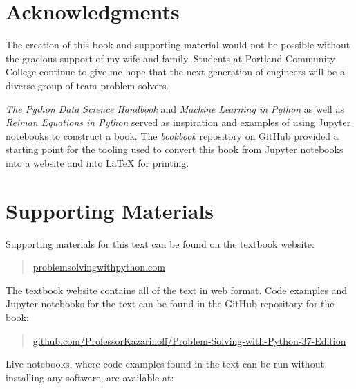\documentclass{book}
\begin{document}
    
        \hypertarget{acknowledgments}{%
\section*{Acknowledgments}\label{acknowledgments} 
 }    




    
        The creation of this book and supporting material would not be possible
without the gracious support of my wife and family. Students at Portland
Community College continue to give me hope that the next generation of
engineers will be a diverse group of team problem solvers.

\emph{The Python Data Science Handbook} and \emph{Machine Learning in
Python} as well as \emph{Reiman Equations in Python} served as
inspiration and examples of using Jupyter notebooks to construct a book.
The \emph{bookbook} repository on GitHub provided a starting point for
the tooling used to convert this book from Jupyter notebooks into a
website and into LaTeX for printing.
    




    
        \hypertarget{supporting-materials}{%
\section*{Supporting Materials}\label{supporting-materials} 
 }    




    
        Supporting materials for this text can be found on the textbook website:

\begin{quote}
\href{https://problemsolvingwithpython.com}{problemsolvingwithpython.com}
\end{quote}

The textbook website contains all of the text in web format. Code
examples and Jupyter notebooks for the text can be found in the GitHub
repository for the book:

\begin{quote}
\href{https://github.com/ProfessorKazarinoff/Problem-Solving-with-Python-37-Edition}{github.com/ProfessorKazarinoff/Problem-Solving-with-Python-37-Edition}
\end{quote}

Live notebooks, where code examples found in the text can be run without
installing any software, are available at:
\end{document}

